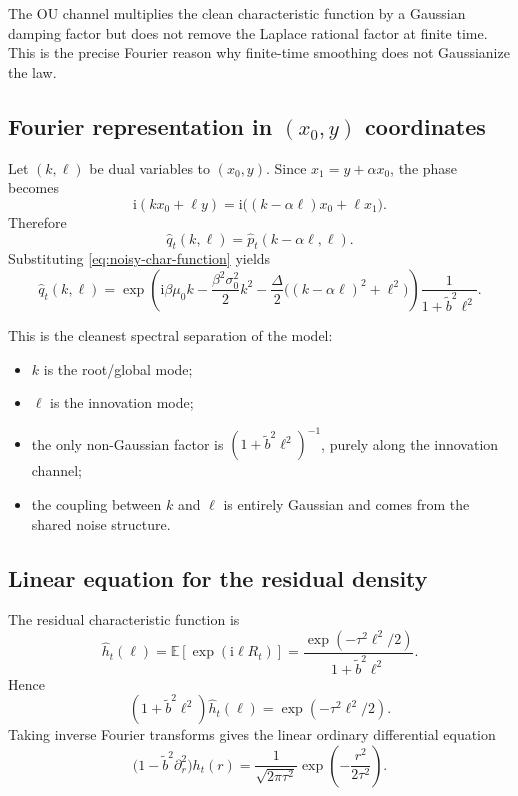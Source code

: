 \documentclass[11pt]{article}
\newcommand{\E}{\mathbb{E}}
\newcommand{\ii}{\mathrm{i}}
\newcommand{\1}{\mathbf{1}}
\newcommand{\sq}[1]{\left[#1\right]}
\theoremstyle{definition}
\begin{document}
The OU channel multiplies the clean characteristic function by a Gaussian damping factor but does not remove the Laplace rational factor at finite time. This is the precise Fourier reason why finite-time smoothing does not Gaussianize the law.

\subsection{Fourier representation in \((x_0,y)\) coordinates}

Let \((k,\ell)\) be dual variables to \((x_0,y)\). Since \(x_1=y+\alpha x_0\), the phase becomes
\begin{equation}
\ii(kx_0+\ell y)=\ii\big((k-\alpha\ell)x_0 + \ell x_1\big).
\end{equation}
Therefore
\begin{equation}
\widehat q_t(k,\ell)=\widehat p_t(k-\alpha\ell,\ell).
\end{equation}
Substituting \eqref{eq:noisy-char-function} yields
\begin{equation}
\label{eq:char-x0-y}
\boxed{
\widehat q_t(k,\ell)
=
\exp\!\left(
\ii\beta\mu_0 k
-\frac{\beta^2\sigma_0^2}{2}k^2
-\frac{\Delta}{2}\big((k-\alpha\ell)^2+\ell^2\big)
\right)
\frac{1}{1+\tilde b^2\ell^2}.
}
\end{equation}

This is the cleanest spectral separation of the model:
\begin{itemize}[leftmargin=2em]
    \item \(k\) is the root/global mode;
    \item \(\ell\) is the innovation mode;
    \item the only non-Gaussian factor is \((1+\tilde b^2\ell^2)^{-1}\), purely along the innovation channel;
    \item the coupling between \(k\) and \(\ell\) is entirely Gaussian and comes from the shared noise structure.
\end{itemize}

\subsection{Linear equation for the residual density}

The residual characteristic function is
\begin{equation}
\label{eq:residual-char-function}
\widehat h_t(\ell)=\E\sq{\exp(\ii\ell R_t)}=\frac{\exp(-\tau^2\ell^2/2)}{1+\tilde b^2\ell^2}.
\end{equation}
Hence
\begin{equation}
(1+\tilde b^2\ell^2)\widehat h_t(\ell)=\exp(-\tau^2\ell^2/2).
\end{equation}
Taking inverse Fourier transforms gives the linear ordinary differential equation
\begin{equation}
\label{eq:linear-ode-ht}
\boxed{
\big(1-\tilde b^2 \partial_r^2\big)h_t(r)=\frac{1}{\sqrt{2\pi\tau^2}}\exp\!\left(-\frac{r^2}{2\tau^2}\right).
}
\end{equation}
\end{document}
